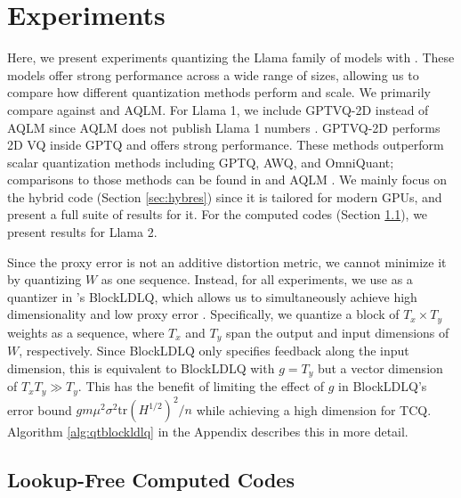 \section{Experiments}

Here, we present experiments quantizing the Llama family of models with \qts \cite{llama1,llama2,llama3}.
These models offer strong performance across a wide range of sizes, allowing us to compare how different quantization methods perform and scale.
We primarily compare \qts against \qss and AQLM.
For Llama 1, we include GPTVQ-2D instead of AQLM since AQLM does not publish Llama 1 numbers \cite{vanbaalen-gptvq}. 
GPTVQ-2D performs 2D VQ inside GPTQ and offers strong performance.
These methods outperform scalar quantization methods including GPTQ, AWQ, and OmniQuant; comparisons to those methods can be found in \qss and AQLM \cite{awq,optq,omniquant,tseng2024quip,aqlm}.
We mainly focus on the hybrid code (Section \ref{sec:hybres}) since it is tailored for modern GPUs, and present a full suite of results for it.
For the computed codes (Section \ref{sec:computedres}), we present results for Llama 2. 

Since the proxy error is not an additive distortion metric, we cannot minimize it by quantizing $W$ as one sequence.
Instead, for all experiments, we use \qts as a quantizer in \qs's BlockLDLQ, which allows us to simultaneously achieve high dimensionality and low proxy error \cite{tseng2024quip}.
Specifically, we quantize a block of $T_x \times T_y$ weights as a sequence, where $T_x$ and $T_y$ span the output and input dimensions of $W$, respectively.
Since BlockLDLQ only specifies feedback along the input dimension, this is equivalent to BlockLDLQ with $g=T_y$ but a vector dimension of $T_xT_y \gg T_y$. 
This has the benefit of limiting the effect of $g$ in BlockLDLQ's error bound $gm\mu^2\sigma^2\mbox{tr}(H^{1/2})^2/n$ while achieving a high dimension for TCQ.
Algorithm \ref{alg:qtblockldlq} in the Appendix describes this in more detail.
\subsection{Lookup-Free Computed Codes}
\label{sec:computedres}


